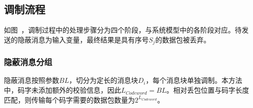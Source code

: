 \subsection{调制流程}
\label{chap:zigzag:model:modulation}


如图\ ，调制过程中的处理步骤分为四个阶段，与系统模型中的各阶段对应。待发送的隐蔽消息为输入变量，最终结果是具有序号$S_{j}$的数据包被丢弃。

\subsubsection{隐蔽消息分组}
\label{chap:zigzag:model:modulation:segment}
隐蔽消息按照参数$BL$，切分为定长的消息块$D_{i}$，每个消息块单独调制。本方法中，码字未添加额外的校验信息，因此$L_{Codeword}=BL$。相对丢包位置与码字长度匹配，则传输每个码字需要的数据包数量为$2^{L_{Codeword}}$。

